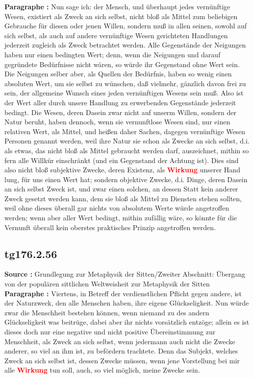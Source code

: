 \documentclass[a4paper,12pt,twoside]{book}
\newcommand{\match}[1]{\textcolor{red}{\textbf{#1}}}
\begin{document}
	\noindent\textbf{Paragraphe : }Nun sage ich: der Mensch, und überhaupt jedes vernünftige Wesen, existiert als Zweck an sich selbst, nicht bloß als Mittel zum beliebigen Gebrauche für diesen oder jenen  Willen, sondern muß in allen seinen, sowohl auf sich selbst, als auch auf andere vernünftige Wesen gerichteten Handlungen jederzeit zugleich als Zweck betrachtet werden. Alle Gegenstände der Neigungen haben nur einen bedingten Wert; denn, wenn die Neigungen und darauf gegründete Bedürfnisse nicht wären, so würde ihr Gegenstand ohne Wert sein. Die Neigungen selber aber, als Quellen der Bedürfnis, haben so wenig einen absoluten Wert, um sie selbst zu wünschen, daß vielmehr, gänzlich davon frei zu sein, der allgemeine Wunsch eines jeden vernünftigen Wesens sein muß. Also ist der Wert aller durch unsere Handlung zu erwerbenden Gegenstände jederzeit bedingt. Die Wesen, deren Dasein zwar nicht auf unserm Willen, sondern der Natur beruht, haben dennoch, wenn sie vernunftlose Wesen sind, nur einen relativen Wert, als Mittel, und heißen daher Sachen, dagegen vernünftige Wesen Personen genannt werden, weil ihre Natur sie schon als Zwecke an sich selbst, d.i. als etwas, das nicht bloß als Mittel gebraucht werden darf, auszeichnet, mithin so fern alle Willkür einschränkt (und ein Gegenstand der Achtung ist). Dies sind also nicht bloß subjektive Zwecke, deren Existenz, als \match{Wirkung} unserer Hand lung, für uns einen Wert hat; sondern objektive Zwecke, d.i. Dinge, deren Dasein an sich selbst Zweck ist, und zwar einen solchen, an dessen Statt kein anderer Zweck gesetzt werden kann, dem sie bloß als Mittel zu Diensten stehen sollten, weil ohne dieses überall gar nichts von absolutem Werte würde angetroffen werden; wenn aber aller Wert bedingt, mithin zufällig wäre, so könnte für die Vernunft überall kein oberstes praktisches Prinzip angetroffen werden. 
	
	\subsection*{tg176.2.56} 
	\textbf{Source : }Grundlegung zur Metaphysik der Sitten/Zweiter Abschnitt: Übergang von der populären sittlichen Weltweisheit zur Metaphysik der Sitten\\  
	
	\noindent\textbf{Paragraphe : }
	Viertens, in Betreff der verdienstlichen Pflicht gegen andere, ist der Naturzweck, den alle Menschen haben, ihre  eigene Glückseligkeit. Nun würde zwar die Menschheit bestehen können, wenn niemand zu des andern Glückseligkeit was beitrüge, dabei aber ihr nichts vorsätzlich entzöge; allein es ist dieses doch nur eine negative und nicht positive Übereinstimmung zur Menschheit, als Zweck an sich selbst, wenn jedermann auch nicht die Zwecke anderer, so viel an ihm ist, zu befördern trachtete. Denn das Subjekt, welches Zweck an sich selbst ist, dessen Zwecke müssen, wenn jene Vorstellung bei mir alle \match{Wirkung} tun soll, auch, so viel möglich, meine Zwecke sein. 
	
\end{document}
